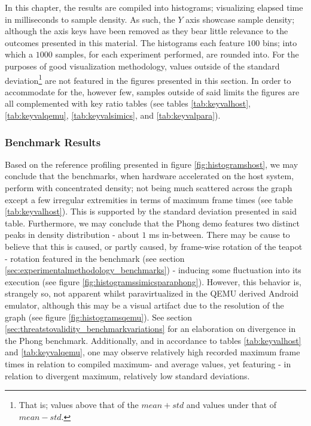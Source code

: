 In this chapter, the results are compiled into histograms; visualizing elapsed time in milliseconds to sample density.
As such, the $Y$ axis showcase sample density; although the axis keys have been removed as they bear little relevance to the outcomes presented in this material.
The histograms each feature $100$ bins; into which a $1000$ samples, for each experiment performed, are rounded into.
For the purposes of good visualization methodology, values outside of the standard deviation\footnote{That is; values above that of the $mean + std$ and values under that of $mean - std$.} are not featured in the figures presented in this section.
In order to accommodate for the, however few, samples outside of said limits the figures are all complemented with key ratio tables (see tables \ref{tab:keyvalhost}, \ref{tab:keyvalqemu}, \ref{tab:keyvalsimics}, and \ref{tab:keyvalpara}).

\subsubsection{Benchmark Results}
\label{sec:results_benchmarkresults}
Based on the reference profiling presented in figure \ref{fig:histogramshost}, we may conclude that the benchmarks, when hardware accelerated on the host system, perform with concentrated density; not being much scattered across the graph except a few irregular extremities in terms of maximum frame times (see table \ref{tab:keyvalhost}).
This is supported by the standard deviation presented in said table.
Furthermore, we may conclude that the Phong demo features two distinct peaks in density distribution - about $1$ ms in-between.
There may be cause to believe that this is caused, or partly caused, by frame-wise rotation of the teapot - rotation featured in the benchmark (see section \ref{sec:experimentalmethodology_benchmarks}) - inducing some fluctuation into its execution (see figure \ref{fig:histogramssimicsparaphong}).
However, this behavior is, strangely so, not apparent whilst paravirtualized in the QEMU derived Android emulator, although this may be a visual artifact due to the resolution of the graph (see figure \ref{fig:histogramsqemu}).
See section \ref{sec:threatstovalidity_benchmarkvariations} for an elaboration on divergence in the Phong benchmark.
Additionally, and in accordance to tables \ref{tab:keyvalhost} and \ref{tab:keyvalqemu}, one may observe relatively high recorded maximum frame times in relation to compiled maximum- and average values, yet featuring - in relation to divergent maximum, relatively low standard deviations.

